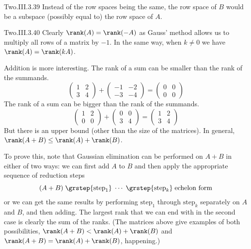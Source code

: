 \begin{ans}{Two.III.3.39}
      Instead of the row spaces being the same, the row space of $B$
      would be a subspace (possibly equal to) the row space of $A$.
    
\end{ans}
\begin{ans}{Two.III.3.40}
      Clearly \( \rank(A)=\rank(-A) \) as Gauss' method allows us to
      multiply all rows of a matrix by \( -1 \).
      In the same way, when \( k\neq 0 \) we have \( \rank(A)=\rank(kA) \).

      Addition is more interesting.
      The rank of a sum can be smaller than the rank of the summands.
      \begin{equation*}
        \begin{pmatrix}
          1  &2  \\
          3  &4
        \end{pmatrix}
        +
        \begin{pmatrix}
         -1  &-2  \\
         -3  &-4
        \end{pmatrix}
        =
        \begin{pmatrix}
         0   &0   \\
         0   &0
        \end{pmatrix}
      \end{equation*}
      The rank of a sum can be bigger than the rank of the summands.
      \begin{equation*}
        \begin{pmatrix}
          1  &2  \\
          0  &0
        \end{pmatrix}
        +
        \begin{pmatrix}
          0  &0   \\
          3  &4
        \end{pmatrix}
        =
        \begin{pmatrix}
         1   &2   \\
         3   &4
        \end{pmatrix}
      \end{equation*}
      But there is an upper bound (other than the size of the matrices).
      In general, \( \rank(A+B)\leq\rank(A)+\rank(B) \).

      To prove this, note that Gaussian elimination can be performed on
      \( A+B \) in either of two ways:
      we can first add \( A \) to \( B \) and then apply the appropriate
      sequence of reduction steps
      \begin{equation*}
        (A+B)
        \;\grstep{\text{step}_1}
        \;\cdots
        \;\grstep{\text{step}_k}
        \;\text{echelon form}
      \end{equation*}
      or we can get the same results by performing \( \text{step}_1 \) through
      \( \text{step}_k \) separately on \( A \) and \( B \), and then adding.
      The largest rank that we can end with in the second case is clearly
      the sum of the ranks.
      (The matrices above give examples of both possibilities,
       $\rank(A+B)<\rank(A)+\rank(B)$ and $\rank(A+B)=\rank(A)+\rank(B)$,
       happening.)
    

\end{ans}
